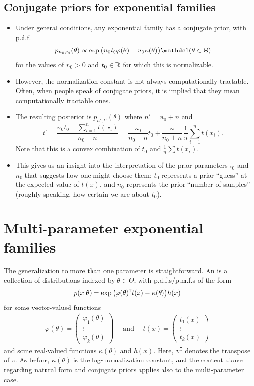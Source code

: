 \documentclass[12pt]{article}
\begin{document}
\subsection{Conjugate priors for exponential families}
\label{section:conjugate-priors}
\begin{itemize}
\item Under general conditions, any exponential family has a conjugate prior, with p.d.f.
$$p_{n_0,t_0}(\theta) \propto \exp\big(n_0 t_0 \varphi(\theta) - n_0 \kappa(\theta)\big)\I(\theta\in\Theta) $$
for the values of $n_0 > 0$ and $t_0\in\mathbb{R}$ for which this is normalizable.
\item However, the normalization constant is not always computationally tractable. Often, when people speak of conjugate priors, it is implied that they mean computationally tractable ones.
\item The resulting posterior is $p_{n',t'}(\theta)$ where $n'=n_0+n$ and 
$$t' = \frac{n_0 t_0 + \sum_{i = 1}^n t(x_i)}{n_0+ n}
 = \frac{n_0}{n_0+ n} t_0 + \frac{n}{n_0+ n}\,\frac{1}{n}\sum_{i = 1}^n t(x_i). $$
Note that this is a convex combination of $t_0$ and $\frac{1}{n}\sum t(x_i)$.
\item This gives us an insight into the interpretation of the prior parameters $t_0$ and $n_0$ that suggests how one might choose them: $t_0$ represents a prior ``guess'' at the expected value of $t(x)$, and $n_0$ represents the prior ``number of samples'' (roughly speaking, how certain we are about $t_0$).
\end{itemize}


\section{Multi-parameter exponential families}

The generalization to more than one parameter is straightforward. An  is a collection of distributions indexed by $\theta\in\Theta$, with p.d.f.s/p.m.f.s of the form
\begin{align}\label{equation:exponential-family}
p(x|\theta) =\exp\big(\varphi(\theta)^{\mathtt{T}} t(x)-\kappa(\theta)\big) h(x)
\end{align}
for some vector-valued functions 
\begin{align*}
\varphi(\theta)=\begin{pmatrix}\varphi_1(\theta) \\ \vdots \\ \varphi_k(\theta)\end{pmatrix}
\quad\mbox{ and }\quad
t(x)=\begin{pmatrix}t_1(x) \\ \vdots \\ t_k(x)\end{pmatrix}
\end{align*}
and some real-valued functions $\kappa(\theta)$ and $h(x)$. Here, $v^{\mathtt{T}}$ denotes the transpose of $v$.
As before, $\kappa(\theta)$ is the log-normalization constant, and the content above regarding natural form and conjugate priors applies also to the multi-parameter case.
\end{document}
